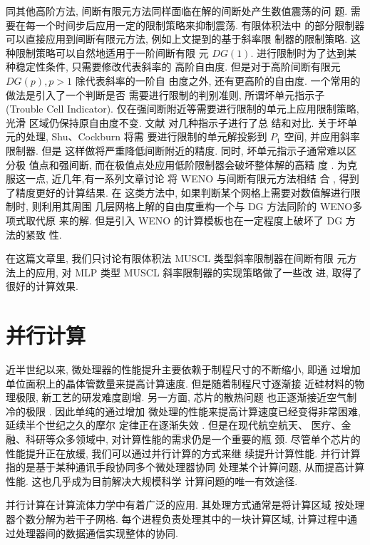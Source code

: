 同其他高阶方法, 间断有限元方法同样面临在解的间断处产生数值震荡的问
题. 需要在每一个时间步后应用一定的限制策略来抑制震荡. 有限体积法中
的部分限制器可以直接应用到间断有限元方法, 例如上文提到的基于斜率限
制器的限制策略. 这种限制策略可以自然地适用于一阶间断有限
元 $DG(1)$. 进行限制时为了达到某种稳定性条件, 只需要修改代表斜率的
高阶自由度. 但是对于高阶间断有限元 $DG(p), p>1$ 除代表斜率的一阶自
由度之外, 还有更高阶的自由度.  一个常用的做法是引入了一个判断是否
需要进行限制的判别准则, 所谓坏单元指示子 (Trouble Cell
Indicator). 仅在强间断附近等需要进行限制的单元上应用限制策略, 光滑
区域仍保持原自由度不变.  文献 \cite{Qiu2005b} 对几种指示子进行了总
结和对比. 关于坏单元的处理, Shu、Cockburn \cite{Cockburn1998} 将需
要进行限制的单元解投影到 $P_{1}$ 空间, 并应用斜率限制器. 但是
这样做将严重降低间断附近的精度.  同时, 坏单元指示子通常难以区分极
值点和强间断, 而在极值点处应用低阶限制器会破坏整体解的高精
度 \cite{Luo2007}. 为克服这一点, 近几年,有一系列文章讨论
将 WENO  与间断有限元方法相结
合 \cite{Zhu2008,Zhu2013,Qiu2005a}, 得到了精度更好的计算结果.  在
这类方法中, 如果判断某个网格上需要对数值解进行限制时, 则利用其周围
几层网格上解的自由度重构一个与 DG 方法同阶的 WENO多项式取代原
来的解. 但是引入 WENO 的计算模板也在一定程度上破坏了 DG 方法的紧致
性.

在这篇文章里, 我们只讨论有限体积法 MUSCL 类型斜率限制器在间断有限
元方法上的应用, 对 MLP 类型 MUSCL 斜率限制器的实现策略做了一些改
进, 取得了很好的计算效果.

\section{并行计算}
\label{sec:parallel}

近半世纪以来, 微处理器的性能提升主要依赖于制程尺寸的不断缩小, 即通
过增加单位面积上的晶体管数量来提高计算速度. 但是随着制程尺寸逐渐接
近硅材料的物理极限, 新工艺的研发难度剧增. 另一方面, 芯片的散热问题
也正逐渐接近空气制冷的极限 \cite{Pacheco2011}. 因此单纯的通过增加
微处理的性能来提高计算速度已经变得非常困难, 延续半个世纪之久的摩尔
定律正在逐渐失效 \cite{Moore1998,Waldrop2016}. 但是在现代航空航天、
医疗、金融、科研等众多领域中, 对计算性能的需求仍是一个重要的瓶
颈. 尽管单个芯片的性能提升正在放缓, 我们可以通过并行计算的方式来继
续提升计算性能. 并行计算指的是基于某种通讯手段协同多个微处理器协同
处理某个计算问题, 从而提高计算性能. 这也几乎成为目前解决大规模科学
计算问题的唯一有效途径.

并行计算在计算流体力学中有着广泛的应用. 其处理方式通常是将计算区域
按处理器个数分解为若干子网格. 每个进程负责处理其中的一块计算区域,
计算过程中通过处理器间的数据通信实现整体的协同.

